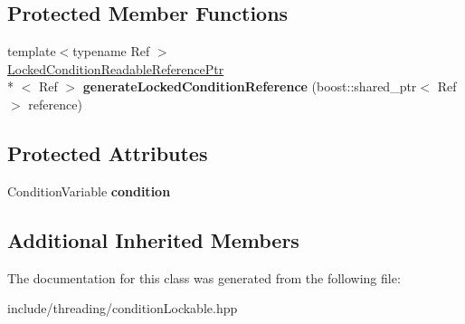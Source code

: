 \subsection*{Protected Member Functions}
\begin{DoxyCompactItemize}
\item 
\hypertarget{classcore_1_1threading_1_1_read_write_condition_lock_a73f39a8f4fb64a367027e0349749a37f}{{\footnotesize template$<$typename Ref $>$ }\\\hyperlink{classcore_1_1threading_1_1_locked_condition_readable_reference_ptr}{Locked\-Condition\-Readable\-Reference\-Ptr}\\*
$<$ Ref $>$ {\bfseries generate\-Locked\-Condition\-Reference} (boost\-::shared\-\_\-ptr$<$ Ref $>$ reference)}\label{classcore_1_1threading_1_1_read_write_condition_lock_a73f39a8f4fb64a367027e0349749a37f}

\end{DoxyCompactItemize}
\subsection*{Protected Attributes}
\begin{DoxyCompactItemize}
\item 
\hypertarget{classcore_1_1threading_1_1_read_write_condition_lock_ac72688c4b6fa820accefa6dc0257e534}{Condition\-Variable {\bfseries condition}}\label{classcore_1_1threading_1_1_read_write_condition_lock_ac72688c4b6fa820accefa6dc0257e534}

\end{DoxyCompactItemize}
\subsection*{Additional Inherited Members}


The documentation for this class was generated from the following file\-:\begin{DoxyCompactItemize}
\item 
include/threading/condition\-Lockable.\-hpp\end{DoxyCompactItemize}
